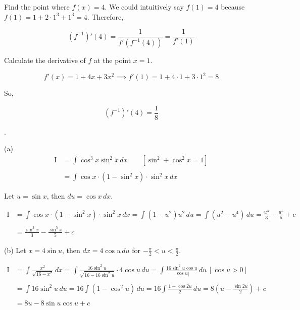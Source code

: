 \documentclass{article}
\begin{document}
\hfill

\noindent Find the point where $f(x)=4$. We could intuitively say $f(1)=4$ because $f(1)=1+2\cdot1^3+1^3=4$. Therefore,

\[\left(f^{-1}\right)'\left(4\right)=\frac1{f'\left(f^{-1}(4)\right)}=\frac1{f'(1)}\]

\hfill

\noindent Calculate the derivative of $f$ at the point $x=1$.

\[f'(x)=1+4x+3x^2\implies f'(1)=1+4\cdot1+3\cdot1^2=8\]

\hfill

\noindent So,

\[\left(f^{-1}\right)'\left(4\right)=\boxed{\frac18}\]

\newpage

.

\hfill

\noindent (a)
\begin{align*}
\mathrm{I}&=\int\cos^3x\sin^2x\,dx\qquad\left[\sin^2+\cos^2x=1\right]\\\\&=\int\cos x\cdot\left(1-\sin^2x\right)\cdot\sin^2x\,dx
\end{align*}

\noindent Let $u=\sin x$, then $du=\cos x\,dx$.

\hfill

\begin{align*}
\mathrm{I}&=\int\cos x\cdot\left(1-\sin^2x\right)\cdot\sin^2x\,dx=\int\left(1-u^2\right) u^2\,du=\int\left(u^2-u^4\right)\,du=\frac{u^3}3-\frac{u^5}5+c\\\\&=\boxed{\frac{\sin^3x}3-\frac{\sin^5x}5+c}
\end{align*}

\hfill

\noindent (b) Let $x=4\sin u$, then $dx=4\cos u\,du$ for $\displaystyle -\frac\pi2<u<\frac\pi2$.

\begin{align*}
\mathrm{I}&=\int\frac{x^2}{\sqrt{16-x^2}}\,dx=\int\frac{16\sin^2u}{\sqrt{16-16\sin^2u}}\cdot4\cos u\,du=\int\frac{16\sin^2u\cos u}{\left|\cos u\right|}\,du\:\left[\cos u>0\right]\\\\&=\int16\sin^2u\,du=16\int\left(1-\cos^2u\right)\,du=16\int\frac{1-\cos2u}2\,du=8\left(u-\frac{\sin2u}2\right)+c\\\\&=8u-8\sin u\cos u+c
\end{align*}
\end{document}

